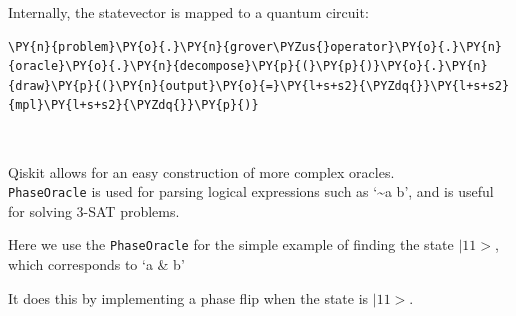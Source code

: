     Internally, the statevector is mapped to a quantum circuit:

    \begin{tcolorbox}[breakable, size=fbox, boxrule=1pt, pad at break*=1mm,colback=cellbackground, colframe=cellborder]
\begin{Verbatim}[commandchars=\\\{\}]
\PY{n}{problem}\PY{o}{.}\PY{n}{grover\PYZus{}operator}\PY{o}{.}\PY{n}{oracle}\PY{o}{.}\PY{n}{decompose}\PY{p}{(}\PY{p}{)}\PY{o}{.}\PY{n}{draw}\PY{p}{(}\PY{n}{output}\PY{o}{=}\PY{l+s+s2}{\PYZdq{}}\PY{l+s+s2}{mpl}\PY{l+s+s2}{\PYZdq{}}\PY{p}{)}
\end{Verbatim}
\end{tcolorbox}
 
            
    
    \begin{center}
    \end{center}
    { \hspace*{\fill} \\}
    

    Qiskit allows for an easy construction of more complex oracles.\\
\texttt{PhaseOracle} is used for parsing logical expressions such as
`\textasciitilde a \textbar{} b', and is useful for solving 3-SAT
problems.

Here we use the \texttt{PhaseOracle} for the simple example of finding
the state \(|11>\), which corresponds to `a \& b'

It does this by implementing a phase flip when the state is \(|11>\).

